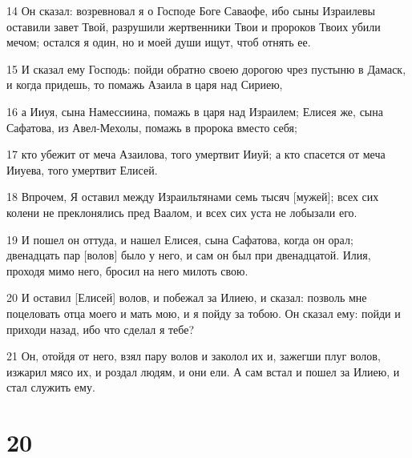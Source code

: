 \par 14 Он сказал: возревновал я о Господе Боге Саваофе, ибо сыны Израилевы оставили завет Твой, разрушили жертвенники Твои и пророков Твоих убили мечом; остался я один, но и моей души ищут, чтоб отнять ее.
\par 15 И сказал ему Господь: пойди обратно своею дорогою чрез пустыню в Дамаск, и когда придешь, то помажь Азаила в царя над Сириею,
\par 16 а Ииуя, сына Намессиина, помажь в царя над Израилем; Елисея же, сына Сафатова, из Авел-Мехолы, помажь в пророка вместо себя;
\par 17 кто убежит от меча Азаилова, того умертвит Ииуй; а кто спасется от меча Ииуева, того умертвит Елисей.
\par 18 Впрочем, Я оставил между Израильтянами семь тысяч [мужей]; всех сих колени не преклонялись пред Ваалом, и всех сих уста не лобызали его.
\par 19 И пошел он оттуда, и нашел Елисея, сына Сафатова, когда он орал; двенадцать пар [волов] было у него, и сам он был при двенадцатой. Илия, проходя мимо него, бросил на него милоть свою.
\par 20 И оставил [Елисей] волов, и побежал за Илиею, и сказал: позволь мне поцеловать отца моего и мать мою, и я пойду за тобою. Он сказал ему: пойди и приходи назад, ибо что сделал я тебе?
\par 21 Он, отойдя от него, взял пару волов и заколол их и, зажегши плуг волов, изжарил мясо их, и роздал людям, и они ели. А сам встал и пошел за Илиею, и стал служить ему.

\chapter{20}

